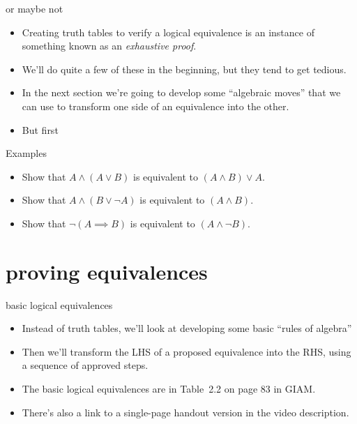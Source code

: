 \documentclass[landscape]{beamer}
\begin{document}
\begin{frame}{or maybe not}
\begin{itemize}
\item Creating truth tables to verify a logical equivalence is an instance of something known as an {\em exhaustive proof}. \pause
\item We'll do quite a few of these in the beginning, but they tend to get tedious.\pause
\item In the next section we're going to develop some ``algebraic moves'' that we can use to transform one side of an equivalence into the other. \pause
\item But first\textellipsis
\end{itemize}
\end{frame}

\begin{frame}{Examples}
\begin{itemize}
\item Show that $A \land (A \lor B)$ is equivalent to $(A \land B) \lor A$. \pause
\item Show that $A \land (B \lor \lnot A)$ is equivalent to $(A \land B)$. \pause
\item Show that $\lnot (A \implies B)$ is equivalent to $(A \land \lnot B)$. 
\end{itemize}
\end{frame}

\section{proving equivalences}

\begin{frame}{basic logical equivalences}
\begin{itemize}
\item Instead of truth tables, we'll look at developing some basic ``rules of algebra'' \pause
\item Then we'll transform the LHS of a proposed equivalence into the RHS, using a sequence of approved steps.\pause
\item The basic logical equivalences are in Table~2.2 on page 83 in GIAM.  \pause
\item There's also a link to a single-page handout version in the video description.  
\end{itemize}
\end{frame}
\end{document}
